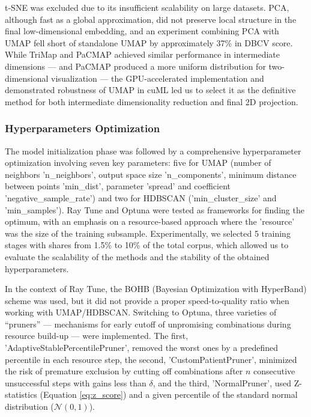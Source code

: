 t-SNE was excluded due to its insufficient scalability on large datasets. PCA, although fast as a global approximation,
did not preserve local structure in the final low-dimensional embedding, and an experiment combining PCA with UMAP fell
short of standalone UMAP by approximately 37\% in DBCV score. While TriMap and PaCMAP achieved similar performance
in intermediate dimensions --- and PaCMAP produced a more uniform distribution for two-dimensional visualization ---
the GPU-accelerated implementation and demonstrated robustness of UMAP in cuML led us to select it as the definitive method
for both intermediate dimensionality reduction and final 2D projection.

\subsubsection{Hyperparameters Optimization}
The model initialization phase was followed by a comprehensive hyperparameter optimization involving seven key parameters:
five for UMAP (number of neighbors 'n\_neighbors', output space size 'n\_components', minimum distance between points 'min\_dist',
parameter 'spread' and coefficient 'negative\_sample\_rate') and two for HDBSCAN ('min\_cluster\_size' and 'min\_samples'). Ray Tune
\parencite{raytune2018liaw} and Optuna \parencite{optuna2019akiba} were tested as frameworks for finding the optimum,
with an emphasis on a resource-based approach where the 'resource' was the size of the training subsample.
Experimentally, we selected 5 training stages with shares from 1.5\% to 10\% of the total corpus, which allowed us
to evaluate the scalability of the methods and the stability of the obtained hyperparameters.

In the context of Ray Tune, the BOHB (Bayesian Optimization with HyperBand) scheme
\parencite{TPEandBO2011bergstra, BOHB2018falkner, hyperband2018li, HPOoverview2015shahriari} was used, but it did not provide
a proper speed-to-quality ratio when working with UMAP/HDBSCAN. Switching to Optuna, three varieties of “pruners” ---
mechanisms for early cutoff of unpromising combinations during resource build-up --- were implemented. The first,
'AdaptiveStablePercentilePruner', removed the worst ones by a predefined percentile in each resource step, the second,
'CustomPatientPruner', minimized the risk of premature exclusion by cutting off combinations after $n$ consecutive
unsuccessful steps with gains less than $\delta$, and the third, 'NormalPruner', used Z-statistics
(Equation \ref{eq:z_score}) and a given percentile of the standard normal distribution ($\mathcal{N}(0, 1)$).

